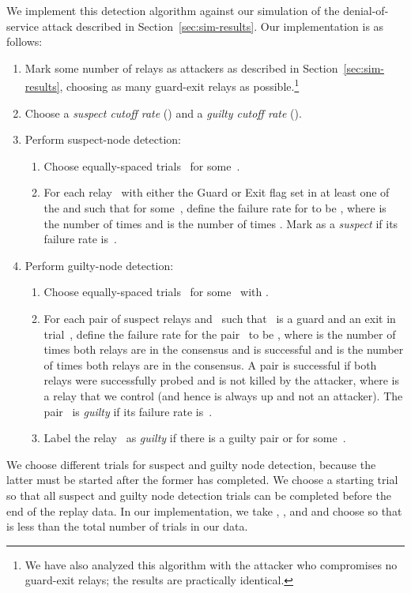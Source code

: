 \documentclass[]{lmcs}
\begin{document}
We implement this detection algorithm against our simulation
of the denial-of-service attack described in
Section~\ref{sec:sim-results}.  Our implementation is as follows:
\begin{enumerate}
\item Mark some number of relays as attackers as described in
Section~\ref{sec:sim-results}, choosing as many guard-exit relays
as possible.\footnote{We have also analyzed this algorithm with the
attacker who compromises no guard-exit relays; the results are practically
identical.}
\item Choose a \emph{suspect cutoff rate} () and a \emph{guilty
cutoff rate} ().
\item Perform suspect-node detection:
\begin{enumerate}
\item Choose  equally-spaced trials~ for
some~.  
\item For each relay~ with either the Guard or Exit flag set
in at least one of the  and such that  for
some~, define
the failure rate for  to be , where  is the number
of times  and  is the number of times
.
Mark  as a \emph{suspect} if its failure rate is~.
\end{enumerate}
\item Perform guilty-node detection:
\begin{enumerate}
\item Choose  equally-spaced trials~ for
some~ with .
\item For each pair of suspect relays  and~ such that~ is
a guard and  an exit in trial~, define the failure rate for
the pair~ to be , where  is the number of times
both relays are in the consensus and  is successful and 
is the number of times both relays are in the consensus.  A pair is successful
if both relays were successfully probed and  is not killed
by the attacker, where  is a relay that we control (and hence is
always up and not an attacker).  The pair~ is \emph{guilty} if
its failure rate is~.
\item Label the relay~ as \emph{guilty} if there is a guilty pair
 or  for some~.
\end{enumerate}
\end{enumerate}

We choose different trials for suspect and guilty node detection, because
the latter must be started after the former has completed.  
We choose a starting trial so that all suspect and guilty node detection
trials can be completed before the end of the replay data.
In our implementation, we take , ,
and  and choose  so that
 is less than the total number of trials in our data.
\end{document}

